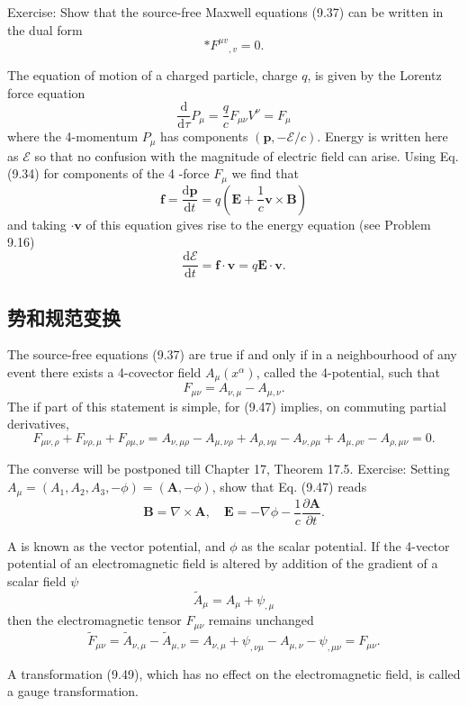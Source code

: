 \documentclass[hyperref,UTF8]{ctexbook}
\begin{document}
Exercise: Show that the source-free Maxwell equations (9.37) can be written in the dual form
$$
* F^{\mu v}{ }_{, v}=0 .
$$

The equation of motion of a charged particle, charge $q$, is given by the Lorentz force equation
$$
\frac{\mathrm{d}}{\mathrm{d} \tau} P_\mu=\frac{q}{c} F_{\mu \nu} V^\nu=F_\mu
$$
where the 4-momentum $P_\mu$ has components $(\mathbf{p},-\mathcal{E} / c)$. Energy is written here as $\mathcal{E}$ so that no confusion with the magnitude of electric field can arise. Using Eq. (9.34) for components of the 4 -force $F_\mu$ we find that
$$
\mathbf{f}=\frac{\mathrm{d} \mathbf{p}}{\mathrm{d} t}=q\left(\mathbf{E}+\frac{1}{c} \mathbf{v} \times \mathbf{B}\right)
$$
and taking $\cdot \mathbf{v}$ of this equation gives rise to the energy equation (see Problem 9.16)
$$
\frac{\mathrm{d} \mathcal{E}}{\mathrm{d} t}=\mathbf{f} \cdot \mathbf{v}=q \mathbf{E} \cdot \mathbf{v} .
$$

\subsection{势和规范变换}

The source-free equations (9.37) are true if and only if in a neighbourhood of any event there exists a 4-covector field $A_\mu\left(x^\alpha\right)$, called the 4-potential, such that
$$
F_{\mu \nu}=A_{\nu, \mu}-A_{\mu, \nu} .
$$
The if part of this statement is simple, for (9.47) implies, on commuting partial derivatives,
$$
F_{\mu \nu, \rho}+F_{\nu \rho, \mu}+F_{\rho \mu, \nu}=A_{\nu, \mu \rho}-A_{\mu, \nu \rho}+A_{\rho, \nu \mu}-A_{\nu, \rho \mu}+A_{\mu, \rho v}-A_{\rho, \mu \nu}=0 .
$$

The converse will be postponed till Chapter 17, Theorem 17.5.
Exercise: Setting $A_\mu=\left(A_1, A_2, A_3,-\phi\right)=(\mathbf{A},-\phi)$, show that Eq. (9.47) reads
$$
\mathbf{B}=\nabla \times \mathbf{A}, \quad \mathbf{E}=-\nabla \phi-\frac{1}{c} \frac{\partial \mathbf{A}}{\partial t} .
$$

A is known as the vector potential, and $\phi$ as the scalar potential.
If the 4-vector potential of an electromagnetic field is altered by addition of the gradient of a scalar field $\psi$
$$
\tilde{A}_\mu=A_\mu+\psi_{, \mu}
$$
then the electromagnetic tensor $F_{\mu \nu}$ remains unchanged
$$
\tilde{F}_{\mu \nu}=\tilde{A}_{\nu, \mu}-\tilde{A}_{\mu, \nu}=A_{\nu, \mu}+\psi_{, \nu \mu}-A_{\mu, \nu}-\psi_{, \mu \nu}=F_{\mu \nu} .
$$

A transformation (9.49), which has no effect on the electromagnetic field, is called a gauge transformation.
\end{document}

